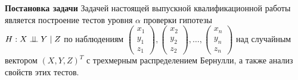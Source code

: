 \textbf{Постановка задачи} \quad
Задачей настоящей выпускной квалификационной работы 
является построение тестов уровня $\alpha$ 
проверки гипотезы \\ $H: X \perp\!\!\!\perp Y \mid Z$
по наблюдениям
$
\begin{pmatrix}
    x_1 \\
    y_1 \\
    z_1
\end{pmatrix},
\begin{pmatrix}
    x_2 \\
    y_2 \\
    z_2
\end{pmatrix}, \ldots,
\begin{pmatrix}
    x_n \\
    y_n \\
    z_n
\end{pmatrix}
$ над случайным вектором $(X,Y,Z)^T$ с
трехмерным распределением Бернулли, а также
анализ свойств этих тестов.
